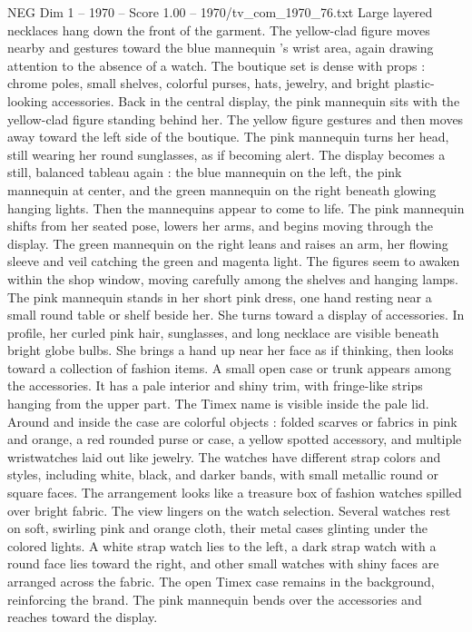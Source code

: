 \begin{textsample}{NEG Dim 1 – 1970 – Score 1.00 – 1970/tv\_com\_1970\_76.txt}
Large layered necklaces hang down the front of the garment.
The yellow-clad figure moves nearby and gestures toward the blue mannequin ’s wrist area, again drawing attention to the absence of a watch.
The boutique set is dense with props : chrome poles, small shelves, colorful purses, hats, jewelry, and bright plastic-looking accessories.
Back in the central display, the pink mannequin sits with the yellow-clad figure standing behind her.
The yellow figure gestures and then moves away toward the left side of the boutique.
The pink mannequin turns her head, still wearing her round sunglasses, as if becoming alert.
The display becomes a still, balanced tableau again : the blue mannequin on the left, the pink mannequin at center, and the green mannequin on the right beneath glowing hanging lights.
Then the mannequins appear to come to life.
The pink mannequin shifts from her seated pose, lowers her arms, and begins moving through the display.
The green mannequin on the right leans and raises an arm, her flowing sleeve and veil catching the green and magenta light.
The figures seem to awaken within the shop window, moving carefully among the shelves and hanging lamps.
The pink mannequin stands in her short pink dress, one hand resting near a small round table or shelf beside her.
She turns toward a display of accessories.
In profile, her curled pink hair, sunglasses, and long necklace are visible beneath bright globe bulbs.
She brings a hand up near her face as if thinking, then looks toward a collection of fashion items.
A small open case or trunk appears among the accessories.
It has a pale interior and shiny trim, with fringe-like strips hanging from the upper part.
The Timex name is visible inside the pale lid.
Around and inside the case are colorful objects : folded scarves or fabrics in pink and orange, a red rounded purse or case, a yellow spotted accessory, and multiple wristwatches laid out like jewelry.
The watches have different strap colors and styles, including white, black, and darker bands, with small metallic round or square faces.
The arrangement looks like a treasure box of fashion watches spilled over bright fabric.
The view lingers on the watch selection.
Several watches rest on soft, swirling pink and orange cloth, their metal cases glinting under the colored lights.
A white strap watch lies to the left, a dark strap watch with a round face lies toward the right, and other small watches with shiny faces are arranged across the fabric.
The open Timex case remains in the background, reinforcing the brand.
The pink mannequin bends over the accessories and reaches toward the display.

\end{textsample}
